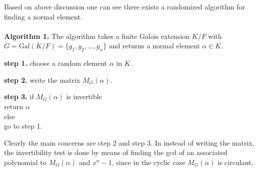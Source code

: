 \documentclass[sigconf]{acmart}
\theoremstyle{acmplain}
\begin{document}
 
 Based on above discussion one can see there exists a randomized algorithm for finding a
 normal element.\\
 \\
 \textbf{Algorithm 1.} \label{Alg:Naive}
 The algorithm takes a finite Galois extension $K/F$ with 
 $G =  \mathrm{Gal}(K/F) = \lbrace g_1, g_2, \ldots , g_n \rbrace$ and returns a normal
 element $\alpha \in K$.
 \begin{description}
 \item \textbf{step 1.} choose a random element $\alpha$ in $K$.
 \item \textbf{step 2.} write the matrix $M_G(\alpha)$.
 \item \textbf{step 3.} if $ M_G(\alpha)$ is invertible\\
 \hspace{10cm} return $\alpha$\\
 \hspace{2cm} else \\
 \hspace{5cm} go to step 1.\\  
 \end{description}
 
 Clearly the main concerns are step 2 and step 3. In \cite{Giesbrecht} instead of writing the matrix, the invertibility
 test is done by means of finding the gcd of an associated polynomial to $M_G(\alpha)$ and $x^n-1$, since in the cyclic
 case $M_G(\alpha)$ is circulant.
 
\end{document}
